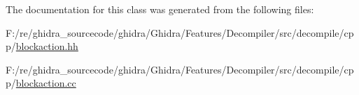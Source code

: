 The documentation for this class was generated from the following files\+:\begin{DoxyCompactItemize}
\item 
F\+:/re/ghidra\+\_\+sourcecode/ghidra/\+Ghidra/\+Features/\+Decompiler/src/decompile/cpp/\mbox{\hyperlink{blockaction_8hh}{blockaction.\+hh}}\item 
F\+:/re/ghidra\+\_\+sourcecode/ghidra/\+Ghidra/\+Features/\+Decompiler/src/decompile/cpp/\mbox{\hyperlink{blockaction_8cc}{blockaction.\+cc}}\end{DoxyCompactItemize}
